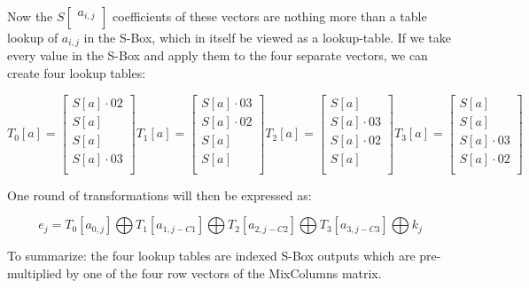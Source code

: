 \documentclass{article}
\begin{document}
Now the $S \begin{bmatrix} a_{i,j} \\ \end{bmatrix}$ coefficients of these vectors are nothing more than a table lookup of $a_{i,j}$ in the S-Box, which in itself be viewed as a lookup-table. If we take every value in the S-Box and apply them to the four separate vectors, we can create four lookup tables:

\[
T_{0}[a] =
\begin{bmatrix}
S[a] \cdot 02 \\
S[a] \\
S[a] \\
S[a] \cdot 03 \\
\end{bmatrix}
T_{1}[a] =
\begin{bmatrix}
S[a] \cdot 03 \\
S[a] \cdot 02\\
S[a] \\
S[a] \\
\end{bmatrix}
T_{2}[a] =
\begin{bmatrix}
S[a] \\
S[a] \cdot 03 \\
S[a] \cdot 02\\
S[a] \\
\end{bmatrix}
T_{3}[a] =
\begin{bmatrix}
S[a] \\
S[a] \\
S[a] \cdot 03\\
S[a] \cdot 02\\
\end{bmatrix}
\]

One round of transformations will then be expressed as:

\[
e_{j} = T_{0}[a_{0,j}]
\bigoplus
T_{1}[a_{1,j-C1}]
\bigoplus
T_{2}[a_{2,j-C2}]
\bigoplus
T_{3}[a_{3,j-C3}]
\bigoplus
k_{j}
\]

To summarize: the four lookup tables are indexed S-Box outputs which are pre-multiplied by one of the four row vectors of the MixColumns matrix.

\end{document}
